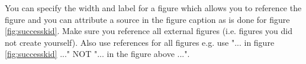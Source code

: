 You can specify the width and label for a figure which allows you to reference the figure and you can attribute a source in the figure caption as is done for figure \ref{fig:successkid}. Make sure you reference all external figures (i.e. figures you did not create yourself). Also use references for all figures e.g. use "... in figure \ref{fig:successkid} ..." NOT "... in the figure above ...".



